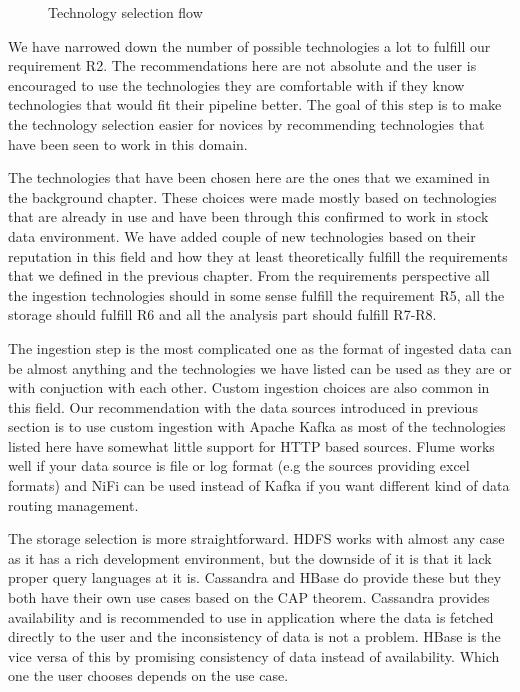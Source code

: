 \begin{figure}[ht!]
    \centering
    \caption{Technology selection flow}
\end{figure}

We have narrowed down the number of possible technologies a lot to fulfill our requirement R2.
The recommendations here are not absolute and the user is encouraged to use the technologies they are comfortable with if they know technologies that would fit their pipeline better.
The goal of this step is to make the technology selection easier for novices by recommending technologies that have been seen to work in this domain.

The technologies that have been chosen here are the ones that we examined in the background chapter.
These choices were made mostly based on technologies that are already in use and have been through this confirmed to work in stock data environment.
We have added couple of new technologies based on their reputation in this field and how they at least theoretically fulfill the requirements that we defined in the previous chapter.
From the requirements perspective all the ingestion technologies should in some sense fulfill the requirement R5, all the storage should fulfill R6 and all the analysis part should fulfill R7-R8.

The ingestion step is the most complicated one as the format of ingested data can be almost anything and the technologies we have listed can be used as they are or with conjuction with each other.
Custom ingestion choices are also common in this field.
Our recommendation with the data sources introduced in previous section is to use custom ingestion with Apache Kafka as most of the technologies listed here have somewhat little support for HTTP based sources.
Flume works well if your data source is file or log format (e.g the sources providing excel formats) and NiFi can be used instead of Kafka if you want different kind of data routing management.

The storage selection is more straightforward.
HDFS works with almost any case as it has a rich development environment, but the downside of it is that it lack proper query languages at it is.
Cassandra and HBase do provide these but they both have their own use cases based on the CAP theorem.
Cassandra provides availability and is recommended to use in application where the data is fetched directly to the user and the inconsistency of data is not a problem.
HBase is the vice versa of this by promising consistency of data instead of availability.
Which one the user chooses depends on the use case.

